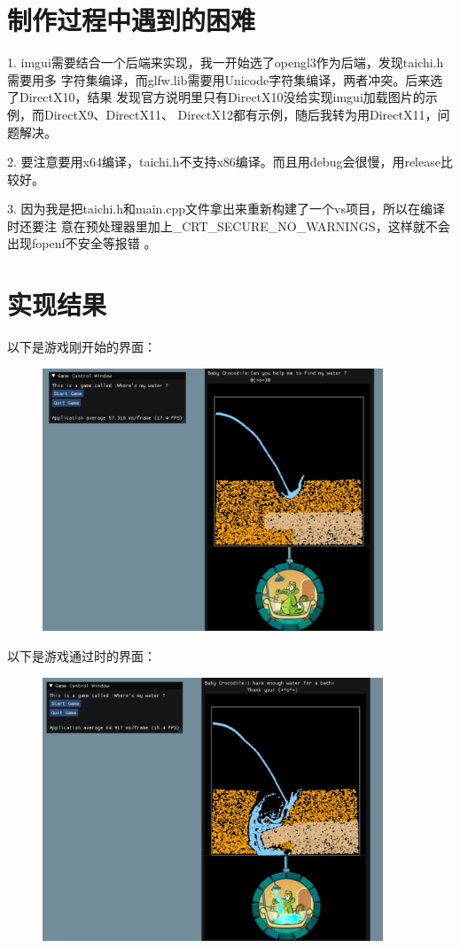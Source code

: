 \documentclass{article}
\begin{document}
	\section{制作过程中遇到的困难}
	1. imgui需要结合一个后端来实现，我一开始选了opengl3作为后端，发现taichi.h需要用多
	字符集编译，而glfw.lib需要用Unicode字符集编译，两者冲突。后来选了DirectX10，结果
	发现官方说明里只有DirectX10没给实现imgui加载图片的示例，而DirectX9、DirectX11、
	DirectX12都有示例，随后我转为用DirectX11，问题解决。
	
	2. 要注意要用x64编译，taichi.h不支持x86编译。而且用debug会很慢，用release比较好。
	
	3. 因为我是把taichi.h和main.cpp文件拿出来重新构建了一个vs项目，所以在编译时还要注
	意在预处理器里加上\_CRT\_SECURE\_NO\_WARNINGS，这样就不会出现fopenf不安全等报错
	。
	\clearpage
	\section{实现结果}
	以下是游戏刚开始的界面：
	\begin{figure}[htb]
		\begin{center}
		\includegraphics[width=4in]{result1.jpg}
		\end{center}
	\end{figure}

	以下是游戏通过时的界面：
	\begin{figure}[htb]
		\begin{center}
			\includegraphics[width=4in]{result2.jpg}
		\end{center}
	\end{figure}
\end{document}
